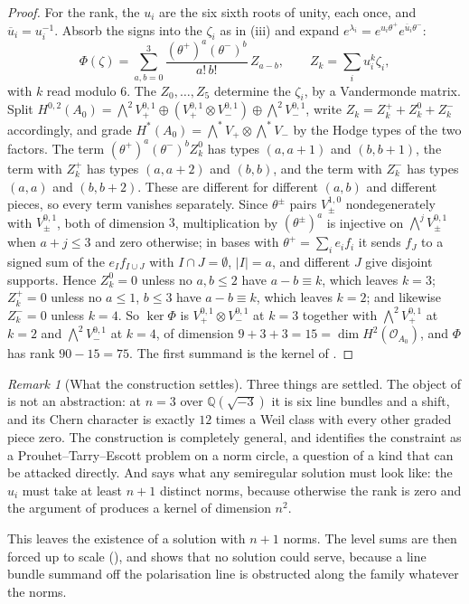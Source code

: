 \documentclass[11pt,reqno]{amsart}
\theoremstyle{plain}
\theoremstyle{definition}
\theoremstyle{remark}
\newtheorem{remark}[theorem]{Remark}
\newcommand{\QQ}{\mathbb{Q}}
\newcommand{\cO}{\mathcal{O}}
\newcommand{\bbar}[1]{\overline{#1}}
\begin{document}
\begin{proof}
For the rank, the $u_{i}$ are the six sixth roots of unity, each once, and
$\bbar u_{i}=u_{i}^{-1}$. Absorb the signs into the $\zeta_{i}$ as in
(iii) and expand
$e^{\lambda_{i}}=e^{u_{i}\theta^{+}}e^{\bbar u_{i}\theta^{-}}$:
\[
  \Phi(\zeta)=\sum_{a,b=0}^{3}\frac{(\theta^{+})^{a}(\theta^{-})^{b}}{a!\,b!}\,Z_{a-b},
  \qquad Z_{k}=\sum_{i}u_{i}^{k}\zeta_{i},
\]
with $k$ read modulo $6$. The $Z_{0},\dots,Z_{5}$ determine the $\zeta_{i}$,
by a Vandermonde matrix. Split
$H^{0,2}(A_{0})=\bigwedge^{2}V_{+}^{0,1}\oplus(V_{+}^{0,1}\otimes V_{-}^{0,1})
\oplus\bigwedge^{2}V_{-}^{0,1}$, write $Z_{k}=Z_{k}^{+}+Z_{k}^{0}+Z_{k}^{-}$
accordingly, and grade $H^{*}(A_{0})=\bigwedge^{*}V_{+}\otimes\bigwedge^{*}V_{-}$
by the Hodge types of the two factors. The term
$(\theta^{+})^{a}(\theta^{-})^{b}Z_{k}^{0}$ has types $(a,a+1)$ and $(b,b+1)$,
the term with $Z_{k}^{+}$ has types $(a,a+2)$ and $(b,b)$, and the term with
$Z_{k}^{-}$ has types $(a,a)$ and $(b,b+2)$. These are different for
different $(a,b)$ and different pieces, so every term vanishes separately.
Since $\theta^{\pm}$ pairs $V_{\pm}^{1,0}$ nondegenerately with $V_{\pm}^{0,1}$,
both of dimension $3$, multiplication by $(\theta^{\pm})^{a}$ is injective on
$\bigwedge^{j}V_{\pm}^{0,1}$ when $a+j\le3$ and zero otherwise; in bases
with $\theta^{+}=\sum_{i}e_{i}f_{i}$ it sends $f_{J}$ to a signed sum of the
$e_{I}f_{I\cup J}$ with $I\cap J=\emptyset$, $|I|=a$, and different $J$ give
disjoint supports. Hence $Z_{k}^{0}=0$ unless no $a,b\le2$ have $a-b\equiv k$,
which leaves $k=3$; $Z_{k}^{+}=0$ unless no $a\le1$, $b\le3$ have
$a-b\equiv k$, which leaves $k=2$; and likewise $Z_{k}^{-}=0$ unless $k=4$. So
$\ker\Phi$ is $V_{+}^{0,1}\otimes V_{-}^{0,1}$ at $k=3$ together with
$\bigwedge^{2}V_{+}^{0,1}$ at $k=2$ and $\bigwedge^{2}V_{-}^{0,1}$ at $k=4$, of
dimension $9+3+3=15=\dim H^{2}(\cO_{A_{0}})$, and $\Phi$ has rank
$90-15=75$. The first summand is the kernel of .
\end{proof}

\begin{remark}[What the construction settles]\label{rem:pteoutcome}
Three things are settled. The object of  is not an
abstraction: at $n=3$ over $\QQ(\sqrt{-3})$ it is six line bundles and a
shift, and its Chern character is exactly $12$ times a Weil class with every
other graded piece zero. The construction is completely general, and
 identifies the constraint as a Prouhet--Tarry--Escott problem
on a norm circle, a question of a kind that can be attacked directly. And
 says what any semiregular solution must look like: the
$u_{i}$ must take at least $n+1$ distinct norms, because otherwise the rank is
zero and the argument of  produces a kernel of
dimension $n^{2}$.

This leaves the existence of a solution with $n+1$ norms. The level sums are
then forced up to scale (), and  shows
that no solution could serve, because a line bundle summand off the
polarisation line is obstructed along the family whatever the norms.
\end{remark}
\end{document}
